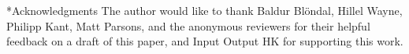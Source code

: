 \documentclass[format=sigplan, review=false, screen=true, 10pt]{acmart}
\makeatletter
\let\origsubsection\subsection
\renewcommand\subsection{\@ifstar{\starsubsection}{\nostarsubsection}}
\newcommand\nostarsubsection[1]
{\subsectionprelude\origsubsection{#1}\subsectionpostlude}
\newcommand\starsubsection[1]
{\subsectionprelude\origsubsection*{#1}\subsectionpostlude}
\newcommand\subsectionprelude{%
  \vspace{-0.25em}
}
\newcommand\subsectionpostlude{%
  \vspace{-0.05em}
}
\makeatother
\begin{document}
\vspace{-0.4em}
\subsection*{Acknowledgments}
\vspace{-0.1em}
The author would like to thank Baldur Blöndal, Hillel Wayne, Philipp Kant, Matt Parsons,
and the anonymous reviewers for
their helpful feedback on a draft of this paper, and Input Output HK for supporting
this work.
\vspace{-0.2em}




\end{document}
